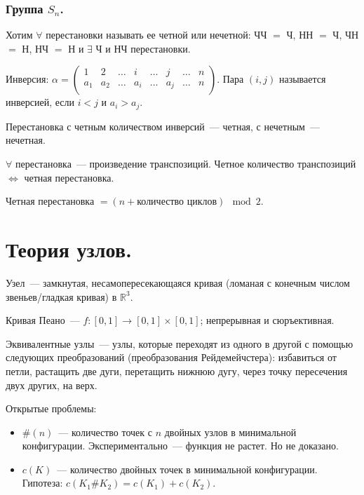 \documentclass[12pt]{article}
\begin{document}
	\subsubsection{Группа $S_n$.}
	\begin{definition}
		Хотим $\forall$ перестановки называть ее четной или нечетной: ЧЧ $=$ Ч, НН $=$ Ч, ЧН $=$ Н, НЧ $=$ Н и $\exists$ Ч и НЧ перестановки.
	\end{definition}
	\begin{definition}
		Инверсия: $\alpha = \begin{pmatrix}
			1 & 2 & \dots & i & \dots & j & \dots & n \\
			a_1 & a_2 & \dots & a_i & \dots & a_j & \dots & n \\
		\end{pmatrix}$. Пара $(i, j)$ называется инверсией, если $i < j$ и $a_i > a_j$.
	\end{definition}
	\begin{definition}
		Перестановка с четным количеством инверсий~--- четная, с нечетным~--- нечетная.
	\end{definition}
	\begin{definition}
		$\forall$ перестановка~--- произведение транспозиций. Четное количество транспозиций $\Leftrightarrow$ четная перестановка.
	\end{definition}
	\begin{definition}
		Четная перестановка $= (n + \text{количество циклов}) \mod{2}$.
	\end{definition}
	
	
	
	\section{Теория узлов.}
	\begin{definition}
		Узел~--- замкнутая, несамопересекающаяся кривая (ломаная с конечным числом звеньев/гладкая кривая) в $\mathbb{R}^3$.
	\end{definition}
	\begin{definition}
		Кривая Пеано~--- $f: [0, 1] \rightarrow [0, 1] \times [0, 1]$; непрерывная и сюръективная.
	\end{definition}
	\begin{definition}
		Эквивалентные узлы~--- узлы, которые переходят из одного в другой с помощью следующих преобразований (преобразования Рейдемейчстера): избавиться от петли, растащить две дуги, перетащить нижнюю дугу, через точку пересечения двух других, на верх.
	\end{definition}
	\begin{note}
		Открытые проблемы:
		\begin{itemize}
			\item $\# (n)$~--- количество точек с $n$ двойных узлов в минимальной конфигурации. Экспериментально~--- функция не растет. Но не доказано.
			\item $c(K)$~--- количество двойных точек в минимальной конфигурации. Гипотеза: $c(K_1 \# K_2) = c(K_1) + c(K_2)$.
		\end{itemize}
	\end{note}
\end{document}
